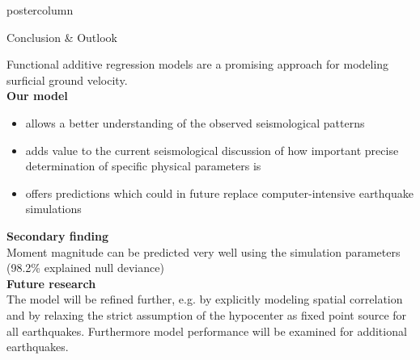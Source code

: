 \documentclass[final,hyperref={pdfpagelabels=false}]{beamer}
\newcommand{\bfGreen}[1]{\textcolor{koalablue}{\textbf{#1}}}
\newcommand*\circled[1]{\tikz[baseline=(char.base)]{
\node[shape=circle,draw,inner sep=2pt] (char) {#1};}}
\begin{document}
\begin{frame}
\begin{columns}
\begin{column}{1\textwidth}
\begin{columns}[T]
\begin{column}{.484\textwidth}
\begin{beamercolorbox}[center,wd=\textwidth]{postercolumn}
\begin{minipage}[T]{.95\textwidth}
\begin{block}{\footnotesize \circled{4} Conclusion \& Outlook}
\begin{minipage}[T]{.95\textwidth}  %
\vspace{1ex}
Functional additive regression models are a promising approach for modeling surficial ground velocity.
\\[2.4ex]
\bfGreen{Our model}
\begin{itemize}
  \item allows a better understanding of the observed seismological patterns
  \item adds value to the current seismological discussion of how important precise determination of specific physical parameters is
  \item offers predictions which could in future replace computer-intensive earthquake simulations
\end{itemize}
\vspace{2.2ex}
{\small
\bfGreen{Secondary finding} \\[0.15cm] Moment magnitude can be predicted very well using the simulation parameters (98.2\% explained null deviance)
}
\\[2.3ex]
\bfGreen{Future research} \\[0.1cm]
The model will be refined further, e.g. by explicitly modeling spatial correlation and by relaxing the strict assumption of the hypocenter as fixed point source for all earthquakes. Furthermore model performance will be examined for additional earthquakes.
\end{minipage}
\end{block}



\end{minipage}
\end{beamercolorbox}
\end{column}
\end{columns}
\end{column}
\end{columns}
\end{frame}
\end{document}
